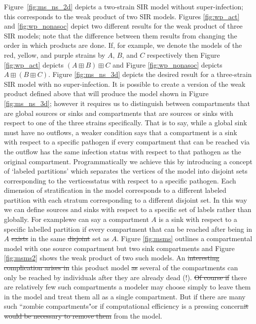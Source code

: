 \documentclass[pdflatex,sn-basic]{sn-jnl}%
\theoremstyle{definition}
\providecommand{\DIFadd}[1]{{\protect\color{blue}\uwave{#1}}} %
\providecommand{\DIFdel}[1]{{\protect\color{red}\sout{#1}}}                      %
\providecommand{\DIFaddbegin}{} %
\providecommand{\DIFaddend}{} %
\providecommand{\DIFdelbegin}{} %
\providecommand{\DIFdelend}{} %
\newcommand{\DIFscaledelfig}{0.5}
\newlength{\DIFdelgraphicswidth} %
\newlength{\DIFdelgraphicsheight} %
\newcommand{\DIFaddincludegraphics}[2][]{{\color{blue}\fbox{\DIFOincludegraphics[#1]{#2}}}} %
\newcommand{\DIFdelincludegraphics}[2][]{%
\sbox{\DIFdelgraphicsbox}{\DIFOincludegraphics[#1]{#2}}%
\settoboxwidth{\DIFdelgraphicswidth}{\DIFdelgraphicsbox} %
\settoboxtotalheight{\DIFdelgraphicsheight}{\DIFdelgraphicsbox} %
\scalebox{\DIFscaledelfig}{%
\parbox[b]{\DIFdelgraphicswidth}{\usebox{\DIFdelgraphicsbox}\\[-\baselineskip] \rule{\DIFdelgraphicswidth}{0em}}\llap{\resizebox{\DIFdelgraphicswidth}{\DIFdelgraphicsheight}{%
\setlength{\unitlength}{\DIFdelgraphicswidth}%
\begin{picture}(1,1)%
\thicklines\linethickness{2pt} %
{\color[rgb]{1,0,0}\put(0,0){\framebox(1,1){}}}%
{\color[rgb]{1,0,0}\put(0,0){\line( 1,1){1}}}%
{\color[rgb]{1,0,0}\put(0,1){\line(1,-1){1}}}%
\end{picture}%
}\hspace*{3pt}}} %
} %
\DeclareRobustCommand{\DIFaddbegin}{\DIFOaddbegin \let\includegraphics\DIFaddincludegraphics} %
\DeclareRobustCommand{\DIFaddend}{\DIFOaddend \let\includegraphics\DIFOincludegraphics} %
\DeclareRobustCommand{\DIFdelbegin}{\DIFOdelbegin \let\includegraphics\DIFdelincludegraphics} %
\DeclareRobustCommand{\DIFdelend}{\DIFOaddend \let\includegraphics\DIFOincludegraphics} %
\begin{document}
Figure~\ref{fig:ms_ns_2d} depicts a two-strain SIR model without super-infection; this corresponds to the weak product of two SIR models. Figures \ref{fig:wp_act} and \ref{fig:wp_nonasoc} depict two different results for the weak product of three SIR models; note that the difference between them results from changing the order in which products are done. If, for example, we denote the models of the red, yellow, and purple strains by $A$, $B$, and $C$ respectively then Figure \ref{fig:wp_act} depicts $(A\boxplus B)\boxplus C$ and Figure \ref{fig:wp_nonasoc} depicts $A\boxplus (B\boxplus C)$. Figure \ref{fig:ms_ns_3d} depicts the desired result for a three-strain SIR model with no super-infection. It is possible to create a version of the weak product defined above that will produce the model shown in Figure \ref{fig:ms_ns_3d}; however it requires us to distinguish between compartments that are global sources or sinks and compartments that are sources or sinks with respect to one of the three strains specifically. That is to say, while a global sink must have no outflows, a weaker condition says that a compartment is a sink with respect to a specific pathogen if every compartment that can be reached via the outflow has the same infection status with respect to that pathogen as the original compartment. Programmatically we achieve this by introducing a concept of `labeled partitions' which separates the vertices of the model into disjoint sets corresponding to the vertices\DIFaddbegin \DIFadd{' }\DIFaddend status with respect to a specific pathogen. Each dimension of stratification in the model corresponds to a different labeled partition with each stratum corresponding to a different disjoint set. In this way we can define sources and sinks with respect to a specific set of labels rather than globally. For example\DIFaddbegin \DIFadd{, }\DIFaddend we can say a compartment $A$ is a sink with respect to a specific labelled partition if every compartment that can be reached after being in $A$ \DIFdelbegin \DIFdel{exists }\DIFdelend \DIFaddbegin \DIFadd{is }\DIFaddend in the same \DIFdelbegin \DIFdel{disjoint }\DIFdelend set as $A$. Figure \ref{fig:msms} outlines a compartmental model with one source compartment but two sink compartments and Figure \ref{fig:msms2} shows the weak product of two such models.
An \DIFdelbegin \DIFdel{interesting complication arises in }\DIFdelend \DIFaddbegin \DIFadd{unfortunate aspect of }\DIFaddend this product model \DIFdelbegin \DIFdel{as }\DIFdelend \DIFaddbegin \DIFadd{is that }\DIFaddend several of the compartments can only be reached by individuals after they are already dead (!).
\DIFdelbegin \DIFdel{Of course if }\DIFdelend \DIFaddbegin \DIFadd{If }\DIFaddend there are relatively few such compartments a modeler may choose simply to leave them in the model and treat them all as a single compartment. But if there are many such “zombie compartments"\DIFaddbegin \DIFadd{, }\DIFaddend or if computational efficiency is a pressing concern\DIFdelbegin \DIFdel{it would be necessary to remove them }\DIFdelend \DIFaddbegin \DIFadd{, they could be removed  }\DIFaddend from the model.
\end{document}
